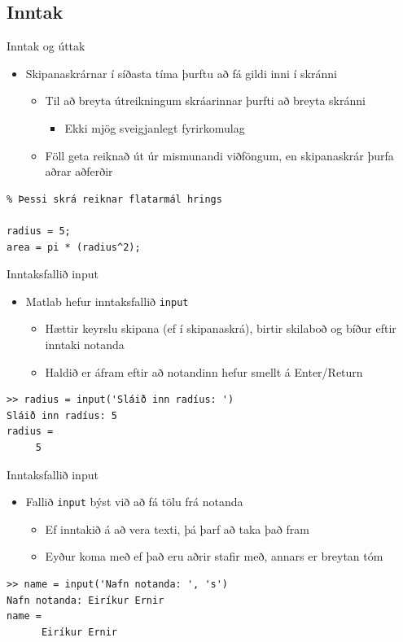 \documentclass[handout]{beamer}
\begin{document}
\subsection{Inntak}

\begin{frame}[fragile]{Inntak og úttak}
\begin{itemize}
 \item Skipanaskrárnar í síðasta tíma þurftu að fá gildi inni í skránni
 \begin{itemize}
  \item Til að breyta útreikningum skráarinnar þurfti að breyta skránni
  \begin{itemize}
   \item Ekki mjög sveigjanlegt fyrirkomulag
  \end{itemize}
  \item Föll geta reiknað út úr mismunandi viðföngum, en skipanaskrár þurfa aðrar aðferðir
 \end{itemize}
\end{itemize}
\begin{verbatim}
% Þessi skrá reiknar flatarmál hrings

radius = 5;
area = pi * (radius^2);
\end{verbatim}
\end{frame}

\begin{frame}[fragile]{Inntaksfallið input}
\begin{itemize}
 \item Matlab hefur inntaksfallið \texttt{input}
 \begin{itemize}
  \item Hættir keyrslu skipana (ef í skipanaskrá), birtir skilaboð og bíður eftir inntaki notanda
  \item Haldið er áfram eftir að notandinn hefur smellt á Enter/Return
 \end{itemize}
\end{itemize}

\begin{verbatim}
>> radius = input('Sláið inn radíus: ')
Sláið inn radíus: 5
radius =
     5
\end{verbatim}
\end{frame}

\begin{frame}[fragile]{Inntaksfallið input}
\begin{itemize}
 \item Fallið \texttt{input} býst við að fá tölu frá notanda
 \begin{itemize}
  \item Ef inntakið á að vera texti, þá þarf að taka það fram
  \item Eyður koma með ef það eru aðrir stafir með, annars er breytan tóm
 \end{itemize}
\end{itemize}

\begin{verbatim}
>> name = input('Nafn notanda: ', 's')
Nafn notanda: Eiríkur Ernir
name = 
      Eiríkur Ernir
\end{verbatim}
\end{frame}
\end{document}
